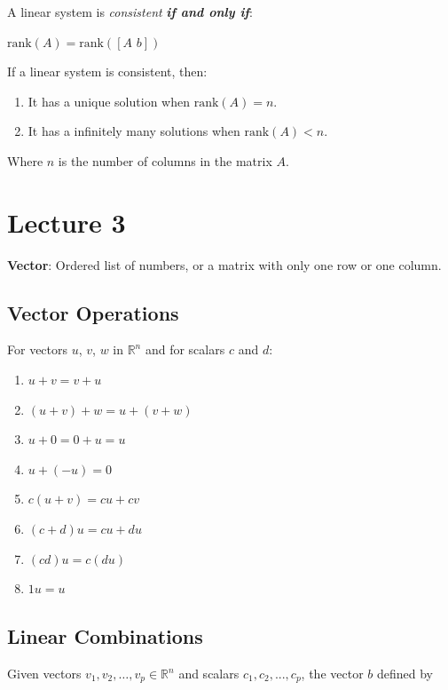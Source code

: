 \documentclass[12pt, letterpaper]{article}
\begin{document}
A linear system is \textit{consistent} \textit{\textbf{if and only if}}:

\medskip
{\centering

  $ \textrm{rank}(A) = \textrm{rank}([ A \hspace{4pt} b ]) $

}
\medskip

If a linear system is consistent, then:

\begin{enumerate}
  \item It has a unique solution when $ \textrm{rank}(A) = n $.
  \item It has a infinitely many solutions when $ \textrm{rank}(A) < n $.
\end{enumerate}

Where $ n $ is the number of columns in the matrix $ A $.

\section*{Lecture 3}

\textbf{Vector}: Ordered list of numbers, or a matrix with only one
row or one column.

\subsection*{Vector Operations}

For vectors $ u $, $ v $, $ w $ in $ \mathbb{R}^n $ and for scalars $
c $ and $ d $:

\begin{enumerate}
  \item $ u + v = v + u $
  \item $ (u + v) + w = u + (v + w) $
  \item $ u + 0 = 0 + u = u $
  \item $ u + (-u) = 0 $
  \item $ c(u + v) = cu + cv $
  \item $ (c + d)u = cu + du $
  \item $ (cd)u = c(du) $
  \item $ 1u = u $
\end{enumerate}

\subsection*{Linear Combinations}

Given vectors $ v_1, v_2, \hdots, v_p \in \mathbb{R}^n $ and scalars
$ c_1, c_2, ..., c_p $, the vector $ b $ defined by
\end{document}
